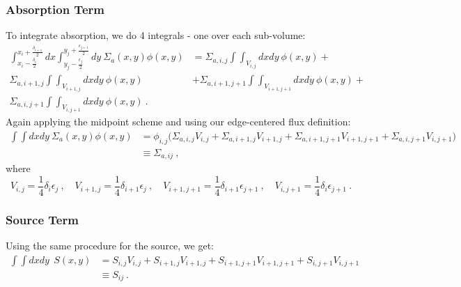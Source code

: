 \documentclass[12pt]{article}
\begin{document}
\subsubsection{Absorption Term}
To integrate absorption, we do 4 integrals - one over each sub-volume:
%
\begin{align}
\int_{x_i-\frac{\delta_{i}}{2}}^{x_i+\frac{\delta_{i+1}}{2}} dx \int_{y_j-\frac{\epsilon_{j}}{2}}^{y_j+\frac{\epsilon_{j+1}}{2}}dy\:\Sigma_a(x,y) \phi(x,y) &= \Sigma_{a,i,j}\int\int_{V_{i,j}} dx dy \: \phi(x,y) + \nonumber \\
%
\Sigma_{a,i+1,j}\int\int_{V_{i+1,j}} dx dy \: \phi(x,y) &+ \Sigma_{a,i+1,j+1}\int\int_{V_{i+1,j+1}} dx dy \: \phi(x,y) + \nonumber \\
 \Sigma_{a,i,j+1}\int\int_{V_{i,j+1}} dx dy \: \phi(x,y) \:.\nonumber
\end{align}
%
Again applying the midpoint scheme and using our edge-centered flux definition:
%
\begin{align}
\int \int dx dy\:\Sigma_a(x,y) \phi(x,y) &= \boxed{\phi_{i,j}\bigl(\Sigma_{a,i,j} V_{i,j} + \Sigma_{a,i+1,j} V_{i+1,j} + \Sigma_{a,i+1,j+1} V_{i+1,j+1} + \Sigma_{a,i,j+1} V_{i,j+1} \bigr) } \nonumber \\
&\equiv \Sigma_{a,ij}\:, \nonumber
\end{align}
%
where
\[V_{i,j} = \frac{1}{4}\delta_i \epsilon_j \:, \quad V_{i+1,j} = \frac{1}{4}\delta_{i+1} \epsilon_{j} \:, \quad V_{i+1,j+1} = \frac{1}{4}\delta_{i+1} \epsilon_{j+1} \:, \quad V_{i,j+1} = \frac{1}{4}\delta_{i} \epsilon_{j+1} \:.\]


\subsubsection{Source Term}
Using the same procedure for the source, we get:
\begin{align}
\int \int dx dy \: \:S(x,y) &= \boxed{ S_{i,j} V_{i,j} + S_{i+1,j} V_{i+1,j} + S_{i+1,j+1} V_{i+1,j+1} + S_{i,j+1} V_{i,j+1} }\nonumber \\
&\equiv S_{ij}\:. \nonumber
\end{align}


\end{document}
